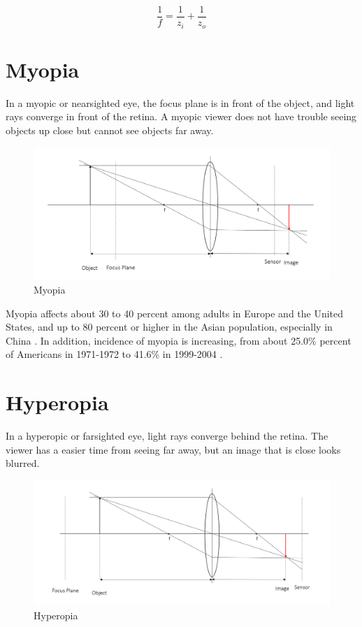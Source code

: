 $$\frac{1}{f} = \frac{1}{z_i} + \frac{1}{z_o}$$
 
\section{Myopia}
In a myopic or nearsighted eye, the focus plane is in front of the object, and light rays converge in front of the retina. A myopic viewer does not have trouble seeing objects up close but cannot see objects far away. 

\begin{figure}[h!]
  \centering
  \includegraphics[width=5.0in]{chapters/chapter2/images/myopia.png}
  \caption{Myopia}
  \label{fig:myopia}
\end{figure}

Myopia affects about 30 to 40 percent among adults in Europe and the United States, and up to 80 percent or higher in the Asian population, especially in China \cite{allaboutvision:2016}. In addition, incidence of myopia is increasing, from about 25.0\% percent of Americans in 1971-1972 to 41.6\% in 1999-2004 \cite{Vitae:2009}.


\section{Hyperopia}
In a hyperopic or farsighted eye, light rays converge behind the retina. The viewer has a easier time from seeing far away, but an image that is close looks blurred. 

\begin{figure}[h!]
  \centering
  \includegraphics[width=5.0in]{chapters/chapter2/images/hyperopia.png}
  \caption{Hyperopia}
  \label{fig:hyperopia}
\end{figure}

